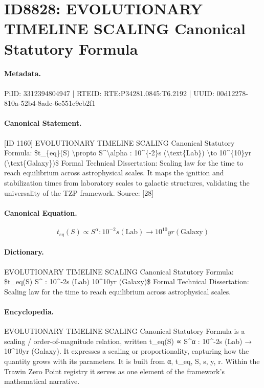 \section*{ID8828: EVOLUTIONARY TIMELINE SCALING Canonical Statutory Formula}
\paragraph{Metadata.}
PiID: 3312394804947 | RTEID: RTE:P34281.0845:T6.2192 | UUID: 00d12278-810a-52b4-8adc-6e551c9eb2f1

\paragraph{Canonical Statement.}
[ID 1160] EVOLUTIONARY TIMELINE SCALING Canonical Statutory Formula: \$t\_\{eq\}(S) \textbackslash{}propto S\textasciicircum{}\textbackslash{}alpha : 10\textasciicircum{}\{-2\}s (\textbackslash{}text\{Lab\}) \textbackslash{}to 10\textasciicircum{}\{10\}yr (\textbackslash{}text\{Galaxy\})\$ Formal Technical Dissertation: Scaling law for the time to reach equilibrium across astrophysical scales. It maps the ignition and stabilization times from laboratory scales to galactic structures, validating the universality of the TZP framework. Source: [28]

\paragraph{Canonical Equation.}
\[
t_{eq}(S) \propto S^\alpha : 10^{-2}s (\text{Lab}) \to 10^{10}yr (\text{Galaxy})
\]

\paragraph{Dictionary.}
EVOLUTIONARY TIMELINE SCALING Canonical Statutory Formula: \$t\_eq(S) S\textasciicircum{} : 10\textasciicircum{}-2s (Lab) 10\textasciicircum{}10yr (Galaxy)\$ Formal Technical Dissertation: Scaling law for the time to reach equilibrium across astrophysical scales.

\paragraph{Encyclopedia.}
EVOLUTIONARY TIMELINE SCALING Canonical Statutory Formula is a scaling / order-of-magnitude relation, written t\_eq(S) ∝ S\textasciicircum{}α : 10\textasciicircum{}-2s (Lab) → 10\textasciicircum{}10yr (Galaxy). It expresses a scaling or proportionality, capturing how the quantity grows with its parameters. It is built from α, t\_eq, S, s, y, r. Within the Trawin Zero Point registry it serves as one element of the framework's mathematical narrative.
